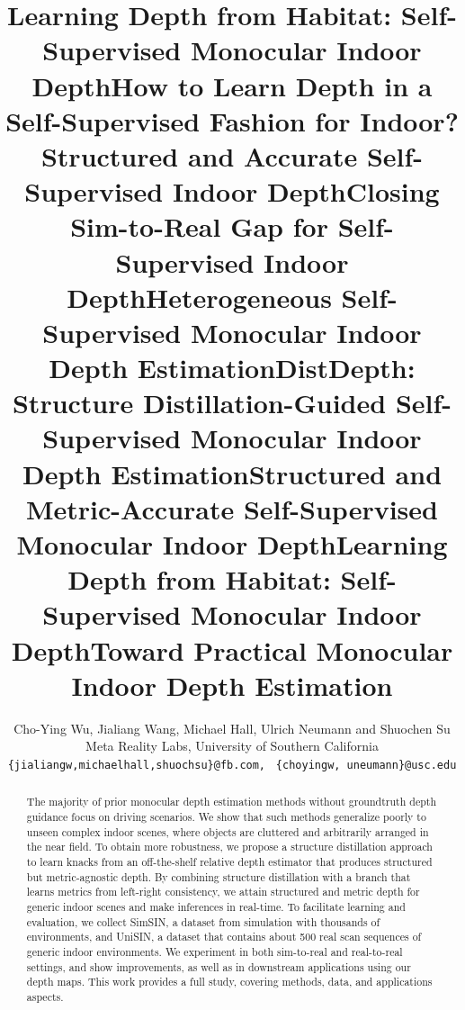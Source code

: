 \documentclass[10pt,twocolumn,letterpaper]{article}
\begin{document}
\title{Learning Depth from Habitat: Self-Supervised Monocular Indoor Depth}
\title{How to Learn Depth in a Self-Supervised Fashion for Indoor?}
\title{Structured and Accurate Self-Supervised Indoor Depth}
\title{Closing Sim-to-Real Gap for Self-Supervised Indoor Depth}
\title{Heterogeneous Self-Supervised Monocular Indoor Depth Estimation}
\title{DistDepth: Structure Distillation-Guided Self-Supervised Monocular Indoor Depth Estimation}
\title{Structured and Metric-Accurate Self-Supervised Monocular Indoor Depth}
\title{Learning Depth from Habitat: Self-Supervised Monocular Indoor Depth}
\title{Toward Practical Monocular Indoor Depth Estimation}

\author{Cho-Ying Wu, Jialiang Wang, Michael Hall, Ulrich Neumann and Shuochen Su \\
Meta Reality Labs, University of Southern California\\
{\tt\small \{jialiangw,michaelhall,shuochsu\}@fb.com, }
{\tt\small \{choyingw, uneumann\}@usc.edu}
}
\makeatletter
\let\@oldmaketitle\@maketitle
\renewcommand{\@maketitle}{\@oldmaketitle
  \centering\texttt{[image: figures/teaser.pdf]}
  \captionof{figure}{\textbf{Advantages of our framework.} (A) We attain zero-shot cross-dataset inference. (B) Our framework trained on simulation data produces on-par results with the one trained on real data.\\}
  \label{teaser}}

\maketitle
\begin{abstract}
The majority of prior monocular depth estimation methods without groundtruth depth guidance focus on driving scenarios. We show that such methods generalize poorly to unseen complex indoor scenes, where objects are cluttered and arbitrarily arranged in the near field. To obtain more robustness, we propose a structure distillation approach to learn knacks from an off-the-shelf relative depth estimator that produces structured but metric-agnostic depth. By combining structure distillation with a branch that learns metrics from left-right consistency, we attain structured and metric depth for generic indoor scenes and make inferences in real-time. To facilitate learning and evaluation, we collect SimSIN, a dataset from simulation with thousands of environments, and UniSIN, a dataset that contains about 500 real scan sequences of generic indoor environments. We experiment in both sim-to-real and real-to-real settings, and show improvements, as well as in downstream applications using our depth maps. This work provides a full study, covering methods, data, and applications aspects.
\end{abstract}
\end{document}
